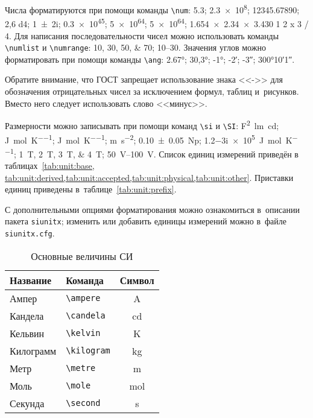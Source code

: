 Числа форматируются при помощи команды \verb|\num|:
\num{5,3};
\num{2,3e8};
\num{12345,67890};
\num{2,6 d4};
\num{1+-2i};
\num{.3e45};
\num[exponent-base=2]{5 e64};
\num[exponent-base=2,exponent-to-prefix]{5 e64};
\num{1.654 x 2.34 x 3.430}
\num{1 2 x 3 / 4}.
Для написания последовательности чисел можно использовать команды \verb|\numlist| и \verb|\numrange|:
\numlist{10;30;50;70}; \numrange{10}{30}.
Значения углов можно форматировать при помощи команды \verb|\ang|:
\ang{2.67};
\ang{30,3};
\ang{-1;;};
\ang{;-2;};
\ang{;;-3};
\ang{300;10;1}.

Обратите внимание, что ГОСТ запрещает использование знака <<->> для обозначения отрицательных чисел
за исключением формул, таблиц и~рисунков.
Вместо него следует использовать слово <<минус>>.

Размерности можно записывать при помощи команд \verb|\si| и \verb|\SI|:
\si{\farad\squared\lumen\candela};
\si{\joule\per\mole\per\kelvin};
\si[per-mode = symbol-or-fraction]{\joule\per\mole\per\kelvin};
\si{\metre\per\second\squared};
\SI{0.10(5)}{\neper};
\SI{1.2-3i e5}{\joule\per\mole\per\kelvin};
\SIlist{1;2;3;4}{\tesla};
\SIrange{50}{100}{\volt}.
Список единиц измерений приведён в таблицах~\cref{tab:unit:base,
    tab:unit:derived,tab:unit:accepted,tab:unit:physical,tab:unit:other}.
Приставки единиц приведены в~таблице~\cref{tab:unit:prefix}.

С дополнительными опциями форматирования можно ознакомиться в~описании пакета \texttt{siunitx};
изменить или добавить единицы измерений можно в~файле \texttt{siunitx.cfg}.

\begin{table}
    \centering
    \captionsetup{justification=centering} %
    \caption{Основные величины СИ}\label{tab:unit:base}
    \begin{tabular}{llc}
        \toprule
        Название  & Команда          & Символ         \\
        \midrule
        Ампер     & \verb|\ampere|   & \si{\ampere}   \\
        Кандела   & \verb|\candela|  & \si{\candela}  \\
        Кельвин   & \verb|\kelvin|   & \si{\kelvin}   \\
        Килограмм & \verb|\kilogram| & \si{\kilogram} \\
        Метр      & \verb|\metre|    & \si{\metre}    \\
        Моль      & \verb|\mole|     & \si{\mole}     \\
        Секунда   & \verb|\second|   & \si{\second}   \\
        \bottomrule
    \end{tabular}
\end{table}

